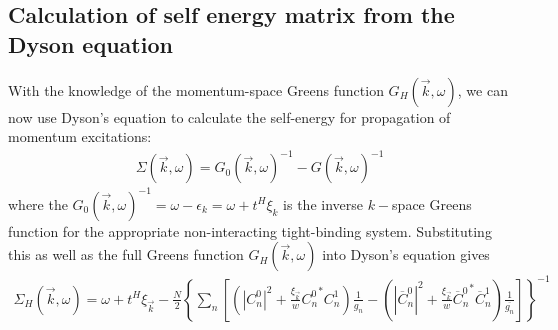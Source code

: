 \documentclass{article}
\numberwithin{equation}{section}
\begin{document}
\subsection{Calculation of self energy matrix from the Dyson equation}
With the knowledge of the momentum-space Greens function $G_H(\vec k, \omega)$, we can now use Dyson's equation to calculate the self-energy for propagation of momentum excitations:
\begin{equation}\begin{aligned}
	\Sigma(\vec k,\omega) = G_0(\vec k,\omega)^{-1} - G(\vec k,\omega)^{-1}
\end{aligned}\end{equation}
where the $G_{0}(\vec k, \omega)^{-1}  = \omega -\epsilon_{k} = \omega +t^{H}\xi_{k}$ is the inverse $k-$space Greens function for the appropriate non-interacting tight-binding system. Substituting this as well as the full Greens function $G_H(\vec k, \omega)$ into Dyson's equation gives
\begin{equation}\begin{aligned}
	\Sigma_H(\vec k,\omega) = \omega +t^{H}\xi_{\vec k} - \frac{N}{2}\left\{\sum_n\left[\left(|C^0_{n}|^2 + \frac{\xi_{\vec{k}}}{w}{C^0_{n}}^* C^1_{n} \right)\frac{1}{g_n} - \left(|\overline C^0_{n}|^2 + \frac{\xi_{\vec{k}}}{w}{\overline C^0_{n}}^* \overline C^1_{n}\right)\frac{1}{\overline{g_n}}\right]\right\}^{-1}
\end{aligned}\end{equation}
\end{document}
